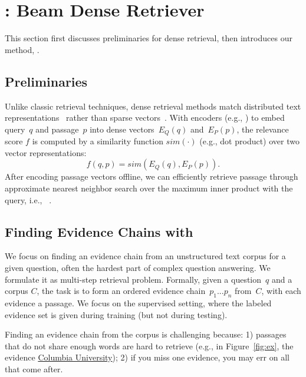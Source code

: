 \section{\name{}: Beam Dense Retriever}
\label{sec:model}


This section first discusses preliminaries 
for dense retrieval, then 
introduces our method, \name{}.

%


\subsection{Preliminaries}

Unlike classic retrieval techniques, dense retrieval methods match
distributed text representations~\cite{bengio-13} rather than sparse
vectors~\cite{salton-68}.
%
With encoders (e.g., \bert{}) to embed query~$q$ and passage~$p$ into
dense vectors~$E_{Q}(q)$ and~$E_{P}(p)$, the relevance score $f$ is
computed by a similarity function $sim(\cdot)$ (e.g., dot product)
over two vector representations:
\begin{equation}
    f(q, p) = sim(E_{Q}(q), E_{P}(p)).
    \label{eqn:sim}
  \end{equation}
  After encoding passage vectors offline, we can efficiently retrieve
  passage through approximate nearest neighbor search over the maximum
  inner product with the query, i.e.,
  ~\cite{shrivastava2014asymmetric,JDH17}.



\subsection{Finding Evidence Chains with \name{}}
\label{subsec:beamdr}

We focus on finding an evidence chain from an unstructured text corpus
for a given question, often the hardest part of complex question
answering.
%
We formulate it as multi-step retrieval problem.
Formally, given a question~$q$ and a corpus $C$, the task is
to form an ordered evidence chain~${p_{1}...p_{n}}$ from~$C$, with
each evidence a passage.
%
We focus on the supervised setting, where the labeled evidence set
is given during training (but not during testing).

Finding an evidence chain from the corpus 
is challenging because:
1) passages that do not share enough words are hard to retrieve 
(e.g., in Figure~\ref{fig:ex}, the evidence \underline{Columbia University});
%
2) if you miss one evidence, you may err on all
that come after.

